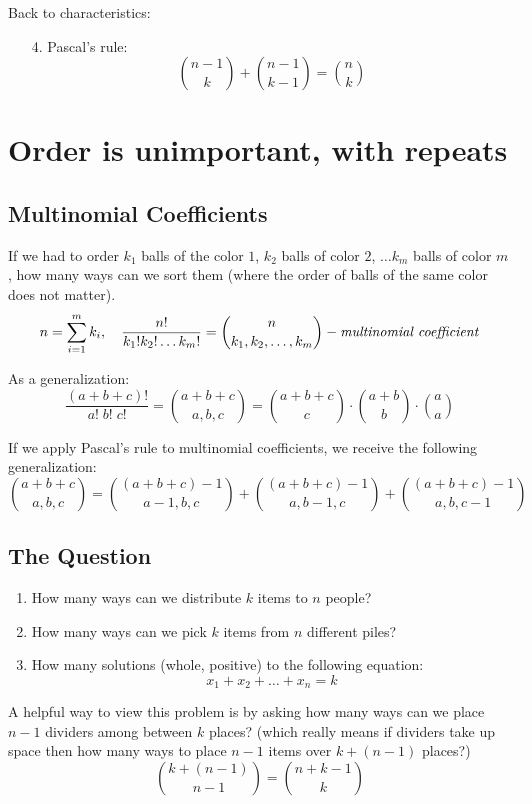 \documentclass[00_complete]{subfiles}
\begin{document}
Back to characteristics:
\begin{enumerate}
    \item[4.] Pascal's rule:
$$\binom{n-1}{k} + \binom{n-1}{k-1} = \binom{n}{k}$$
\end{enumerate}

\section{Order is unimportant, with repeats}

\subsection{Multinomial Coefficients}

If we had to order $k_1$ balls of the color $1$, $k_2$ balls of color $2$,
$\dots k_m$ balls of color $m$, how many ways can we sort them (where the order
of balls of the same color does not matter).
$$
    n = \sum_{i=1}^m k_i, \quad \frac{n!}{k_1!k_2!\dots k_m!}
    = \binom{n}{k_1,k_2,\dots,k_m} -
    \text{\emph{multinomial coefficient}}
$$

As a generalization:
$$\frac{(a+b+c)!}{a!\;b!\;c!} =\binom{a+b+c}{a,b,c} = \binom{a+b+c}{c}\cdot\binom{a+b}{b}\cdot\binom{a}{a}$$

If we apply Pascal's rule to multinomial coefficients, we receive the following
generalization:
$$\binom{a+b+c}{a,b,c} = \binom{(a+b+c)-1}{a-1,b,c}+\binom{(a+b+c)-1}{a,b-1,c}+\binom{(a+b+c)-1}{a,b,c-1}$$

\subsection{The Question}

\begin{enumerate}
\item How many ways can we distribute $k$ items to $n$ people?
\item How many ways can we pick $k$ items from $n$ different piles?
\item How many solutions (whole, positive) to the following equation:
$$x_1+x_2+\dots+x_n=k$$
\end{enumerate}

A helpful way to view this problem is by asking how many ways can we place
$n-1$ dividers among between $k$ places? (which really means if dividers take
up space then how many ways to place $n-1$ items over $k + (n-1)$ places?)
$$\binom{k+(n-1)}{n-1} = \boxed{\binom{n+k-1}{k}}$$
\end{document}
